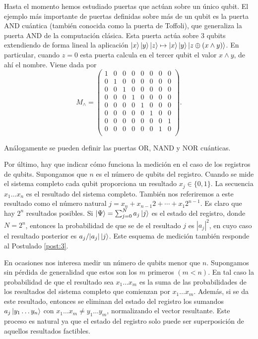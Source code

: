 \documentclass{article}
\begin{document}
Hasta el momento hemos estudiado puertas que actúan sobre un único qubit. El ejemplo más importante de puertas definidas sobre más de un qubit es  la puerta AND cuántica (también conocida como la puerta de Toffoli), que generaliza la puerta AND de la computación clásica. Esta puerta actúa sobre $3$ qubits extendiendo de forma lineal la aplicación $\ket{x}\ket{y}\ket{z} \mapsto \ket{x}\ket{y}\ket{z\oplus(x \land y)}$. En particular, cuando $z = 0$ esta puerta calcula en el tercer qubit el valor $x \land y$, de ahí el nombre. Viene dada por
\[ M_{\land} = \begin{pmatrix}
1 & 0 & 0 & 0 & 0 & 0 & 0 & 0\\
0 & 1 & 0 & 0 & 0 & 0 & 0 & 0\\
0 & 0 & 1 & 0 & 0 & 0 & 0 & 0\\
0 & 0 & 0 & 1 & 0 & 0 & 0 & 0\\
0 & 0 & 0 & 0 & 1 & 0 & 0 & 0\\
0 & 0 & 0 & 0 & 0 & 1 & 0 & 0\\
0 & 0 & 0 & 0 & 0 & 0 & 0 & 1\\
0 & 0 & 0 & 0 & 0 & 0 & 1 & 0\\
\end{pmatrix}.\]

Análogamente se pueden definir las puertas OR, NAND y NOR cuánticas.

Por último, hay que indicar cómo funciona la medición en el caso de los registros de qubits. Supongamos que $n$ es el número de qubits del registro. Cuando se mide el sistema completo cada qubit proporciona un resultado $x_j \in \{0,1\}$. La secuencia $x_1 \ldots x_n$ es el resultado del sistema completo. También nos referiremos a este resultado como el número natural $j = x_n + x_{n-1}2 + \cdots + x_1 2^{n-1}$. Es claro que hay $2^n$ resultados posibles. Si $\ket{\Psi} = \sum_{j = 0}^{N} a_j \ket{j}$ es el estado del registro, donde $N = 2^n$, entonces la probabilidad de que se de el resultado $j$ es $|a_j|^2$, en cuyo caso el resultado posterior es $a_j / |a_j| \ket{j}$. Este esquema de medición también responde al Postulado \ref{post:3}. 

En ocasiones nos interesa medir un número de qubits menor que $n$. Supongamos sin pérdida de generalidad que estos son los $m$ primeros $(m < n)$. En tal caso la probabilidad de que el resultado sea $x_1 \ldots x_m$ es la suma de las probabilidades de los resultados del sistema completo que comienzan por $x_1 \ldots x_m$. Además, si se da este resultado, entonces se eliminan del estado del registro los sumandos $a_j \ket{y_1 \ldots y_n}$ con $x_1 \ldots x_m \ne y_1 \ldots y_m$, normalizando el vector resultante. Este proceso es natural ya que el estado del registro solo puede ser superposición de aquellos resultados factibles.
\end{document}

